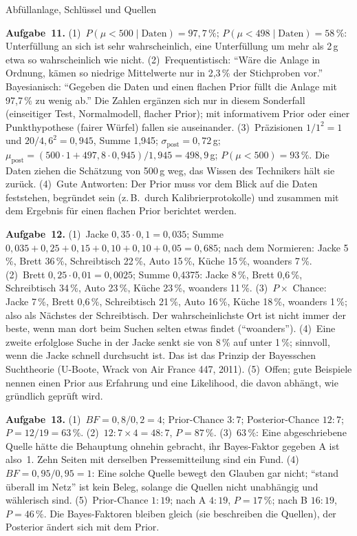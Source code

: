 \begin{uebungsblattc}{Abfüllanlage, Schlüssel und Quellen}
\begin{lehrhinweis}
\textbf{Aufgabe~11.} (1)~$P(\mu<500\mid\text{Daten})=97{,}7\,\%$;
$P(\mu<498\mid\text{Daten})=58\,\%$: Unterfüllung an sich ist sehr
wahrscheinlich, eine Unterfüllung um mehr als 2\,g etwa so wahrscheinlich
wie nicht. (2)~Frequentistisch: \enquote{Wäre die Anlage in Ordnung,
kämen so niedrige Mittelwerte nur in 2,3\,\% der Stichproben vor.}
Bayesianisch: \enquote{Gegeben die Daten und einen flachen Prior füllt
die Anlage mit 97,7\,\% zu wenig ab.} Die Zahlen ergänzen sich nur in
diesem Sonderfall (einseitiger Test, Normalmodell, flacher Prior); mit
informativem Prior oder einer Punkthypothese (fairer Würfel) fallen sie
auseinander. (3)~Präzisionen $1/1^2=1$ und $20/4{,}6^2=0{,}945$, Summe
1,945; $\sigma_{\text{post}}=0{,}72$\,g;
$\mu_{\text{post}}=(500\cdot1+497{,}8\cdot0{,}945)/1{,}945=498{,}9$\,g;
$P(\mu<500)=93\,\%$. Die Daten ziehen die Schätzung von 500\,g weg, das
Wissen des Technikers hält sie zurück. (4)~Gute Antworten: Der Prior muss
vor dem Blick auf die Daten feststehen, begründet sein (z.\,B.\ durch
Kalibrierprotokolle) und zusammen mit dem Ergebnis für einen flachen
Prior berichtet werden.

\textbf{Aufgabe~12.} (1)~Jacke $0{,}35\cdot0{,}1=0{,}035$; Summe
$0{,}035+0{,}25+0{,}15+0{,}10+0{,}10+0{,}05=0{,}685$; nach dem Normieren:
Jacke 5\,\%, Brett 36\,\%, Schreibtisch 22\,\%, Auto 15\,\%, Küche
15\,\%, woanders 7\,\%. (2)~Brett $0{,}25\cdot0{,}01=0{,}0025$; Summe
0,4375: Jacke 8\,\%, Brett 0,6\,\%, Schreibtisch 34\,\%, Auto 23\,\%,
Küche 23\,\%, woanders 11\,\%. (3)~$P\times$ Chance: Jacke 7\,\%, Brett
0,6\,\%, Schreibtisch 21\,\%, Auto 16\,\%, Küche 18\,\%, woanders 1\,\%;
also als Nächstes der Schreibtisch. Der wahrscheinlichste Ort ist nicht
immer der beste, wenn man dort beim Suchen selten etwas findet
(\enquote{woanders}). (4)~Eine zweite erfolglose Suche in der Jacke
senkt sie von 8\,\% auf unter 1\,\%; sinnvoll, wenn die Jacke schnell
durchsucht ist. Das ist das Prinzip der Bayesschen Suchtheorie (U-Boote,
Wrack von Air France 447, 2011). (5)~Offen; gute Beispiele nennen einen
Prior aus Erfahrung und eine Likelihood, die davon abhängt, wie gründlich
geprüft wird.

\textbf{Aufgabe~13.} (1)~$\mathit{BF}=0{,}8/0{,}2=4$; Prior-Chance
$3:7$; Posterior-Chance $12:7$; $P=12/19=63\,\%$. (2)~$12:7\times4=48:7$,
$P=87\,\%$. (3)~63\,\%: Eine abgeschriebene Quelle hätte die Behauptung
ohnehin gebracht, ihr Bayes-Faktor gegeben A ist also~1. Zehn Seiten mit
derselben Pressemitteilung sind ein Fund. (4)~$\mathit{BF}=0{,}95/0{,}95=1$:
Eine solche Quelle bewegt den Glauben gar nicht; \enquote{stand überall im
Netz} ist kein Beleg, solange die Quellen nicht unabhängig und
wählerisch sind. (5)~Prior-Chance $1:19$; nach A $4:19$, $P=17\,\%$; nach
B $16:19$, $P=46\,\%$. Die Bayes-Faktoren bleiben gleich (sie beschreiben
die Quellen), der Posterior ändert sich mit dem Prior.
\end{lehrhinweis}
\end{uebungsblattc}
